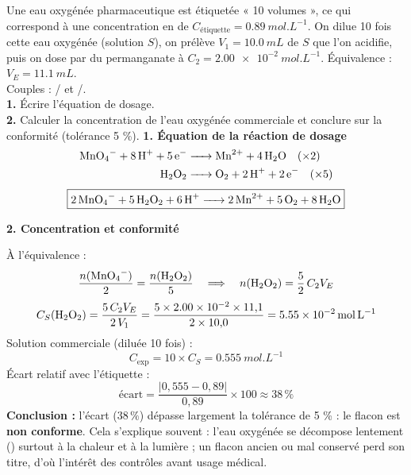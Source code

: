 \documentclass[11pt]{article}
\begin{document}
\begin{exoresolu}
Une eau oxygénée pharmaceutique est étiquetée « 10 volumes », ce qui correspond à une concentration en  de $C_{\text{étiquette}} = \SI{0,89}{mol.L^{-1}}$. On dilue 10 fois cette eau oxygénée (solution $S$), on prélève $V_1 = \SI{10,0}{mL}$ de $S$ que l'on acidifie, puis on dose par du permanganate à $C_2 = \SI{2,00e-2}{mol.L^{-1}}$. Équivalence : $V_E = \SI{11,1}{mL}$.\\
Couples : / et /.\\
\textbf{1.} Écrire l'équation de dosage.\\
\textbf{2.} Calculer la concentration de l'eau oxygénée commerciale et conclure sur la conformité (tolérance 5 \%).
\tcblower
\textbf{1. Équation de la réaction de dosage}
\begin{align*}
\ce{MnO4- + 8H+ + 5e-} &\ce{-> Mn^2+ + 4H2O} \quad (\times 2)\\
\ce{H2O2} &\ce{-> O2 + 2H+ + 2e-} \quad (\times 5)
\end{align*}
\[ \boxed{\ce{2MnO4- + 5H2O2 + 6H+ -> 2Mn^2+ + 5O2 + 8H2O}} \]

\textbf{2. Concentration et conformité}

À l'équivalence :
\[ \frac{n(\ce{MnO4-})}{2} = \frac{n(\ce{H2O2})}{5} \quad\Longrightarrow\quad n(\ce{H2O2}) = \frac{5}{2}\,C_2 V_E \]
\[ C_S(\ce{H2O2}) = \frac{5\,C_2 V_E}{2\,V_1} = \frac{5 \times \SI{2,00e-2}{} \times 11{,}1}{2 \times 10{,}0} = \SI{5,55e-2}{mol.L^{-1}} \]
Solution commerciale (diluée 10 fois) :
\[ C_{\text{exp}} = 10 \times C_S = \SI{0,555}{mol.L^{-1}} \]
Écart relatif avec l'étiquette :
\[ \text{écart} = \frac{|0{,}555 - 0{,}89|}{0{,}89} \times 100 \approx 38\,\% \]
\textbf{Conclusion :} l'écart ($38\,\%$) dépasse largement la tolérance de 5 \% : le flacon est \textbf{non conforme}. Cela s'explique souvent : l'eau oxygénée se décompose lentement () surtout à la chaleur et à la lumière ; un flacon ancien ou mal conservé perd son titre, d'où l'intérêt des contrôles avant usage médical.
\end{exoresolu}
\end{document}
